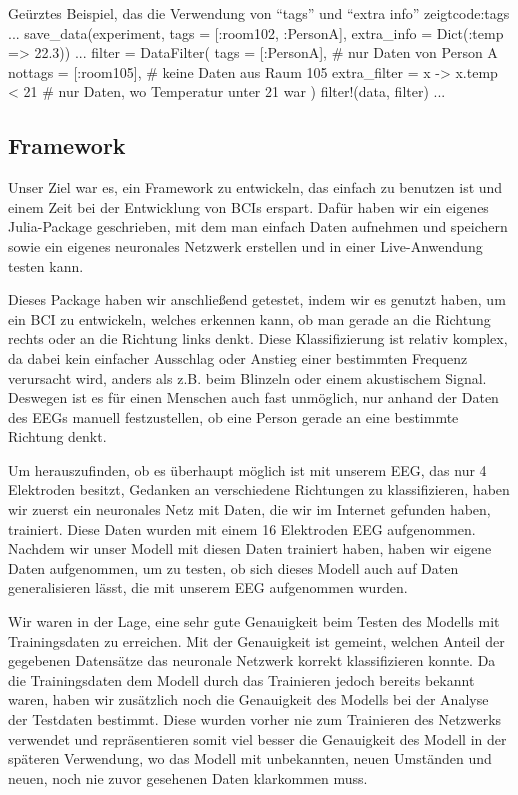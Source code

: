 \documentclass[10pt]{article}
\begin{document}
\begin{code}{Geürztes Beispiel, das die Verwendung von \enquote{tags} und \enquote{extra info} zeigt}{code:tags}
...
save_data(experiment, tags = [:room102, :PersonA], 
    extra_info = Dict(:temp => 22.3))
...
filter = DataFilter(
    tags = [:PersonA], # nur Daten von Person A
    nottags = [:room105], # keine Daten aus Raum 105
    extra_filter = x -> x.temp < 21 # nur Daten, wo Temperatur unter 21 war
)
filter!(data, filter)
...
\end{code}
\subsection{Framework}

Unser Ziel war es, ein Framework zu entwickeln, das einfach zu benutzen ist und einem Zeit bei der Entwicklung von BCIs erspart. Dafür haben wir ein eigenes Julia-Package geschrieben, mit dem man einfach Daten aufnehmen und speichern sowie ein eigenes neuronales Netzwerk erstellen und in einer Live-Anwendung testen kann.

Dieses Package haben wir anschließend getestet, indem wir es genutzt haben, um ein BCI zu entwickeln, welches erkennen kann, ob man gerade an die Richtung rechts oder an die Richtung links denkt. Diese Klassifizierung ist relativ komplex, da dabei kein einfacher Ausschlag oder Anstieg einer bestimmten Frequenz verursacht wird, anders als z.B. beim Blinzeln oder einem akustischem Signal. Deswegen ist es für einen Menschen auch fast unmöglich, nur anhand der Daten des EEGs manuell festzustellen, ob eine Person gerade an eine bestimmte Richtung denkt.

Um herauszufinden, ob es überhaupt möglich ist mit unserem EEG, das nur 4 Elektroden besitzt, Gedanken an verschiedene Richtungen zu klassifizieren, haben wir zuerst ein neuronales Netz mit Daten, die wir im Internet gefunden haben, trainiert. Diese Daten wurden mit einem 16 Elektroden EEG aufgenommen. Nachdem wir unser Modell mit diesen Daten trainiert haben, haben wir eigene Daten aufgenommen, um zu testen, ob sich dieses Modell auch auf Daten generalisieren lässt, die mit unserem EEG aufgenommen wurden.

Wir waren in der Lage, eine sehr gute Genauigkeit beim Testen des Modells mit Trainingsdaten zu erreichen. 
Mit der Genauigkeit ist gemeint, welchen Anteil der gegebenen Datensätze das neuronale Netzwerk korrekt klassifizieren konnte. 
Da die Trainingsdaten dem Modell durch das Trainieren jedoch bereits bekannt waren, haben wir zusätzlich noch die Genauigkeit des Modells bei der Analyse der Testdaten bestimmt. 
Diese wurden vorher nie zum Trainieren des Netzwerks verwendet und repräsentieren somit viel besser die Genauigkeit des Modell in der späteren Verwendung, wo das Modell mit unbekannten, neuen Umständen und neuen, noch nie zuvor gesehenen Daten klarkommen muss. %
\end{document}
